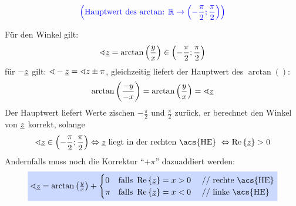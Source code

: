 \begin{minipage}{0.5\textwidth}
\end{minipage}
\hfill
\begin{minipage}{0.4\textwidth}
\[\color{blue}\left(\text{Hauptwert des $\arctan$: }
  \mathbb{R}\to\left(-\frac{\pi}{2};\frac{\pi}{2}\right)
  \right)\]
\end{minipage}

Für den Winkel gilt:
\[\sphericalangle \underline{z} = \arctan\left(\frac{y}{x}\right)
  \in \left(-\frac{\pi}{2};\frac{\pi}{2}\right) \]
für $-\underline{z}$ gilt: $\sphericalangle-\underline{z} = \sphericalangle z \pm\pi$,
gleichzeitig liefert der Hauptwert des $\arctan()$:
\[\arctan{\left(\frac{-y}{-x}\right) = \arctan\left(\frac{y}{x}\right)}
  =\sphericalangle\underline{z}\]
Der Hauptwert liefert Werte zischen $-\frac{\pi}{2}$ und $\frac{\pi}{2}$
zurück, er berechnet den Winkel von $\underline{z}$ korrekt, solange
\[\angle\cn{z} \in \left(-\frac{\pi}{2};\frac{\pi}{2}\right)
  \Leftrightarrow \cn{z} \text{ liegt in der rechten \acs{HE} }
  \Leftrightarrow \Re{\cn z} > 0\]
Andernfalls  muss noch die Korrektur "`$+\pi$"' dazuaddiert werden:
\[\colorbox{emphlight}{$\angle\cn{z} = \arctan\left(\frac{y}{x}\right)
  + \begin{cases}
      0 & \text{falls } \Re{\cn{z}}=x > 0 \text{ \quad// rechte \acs{HE}} \\
      \pi & \text{falls } \Re{\cn{z}}=x < 0 \text{ \quad// linke \acs{HE}}
    \end{cases}$}
\]




